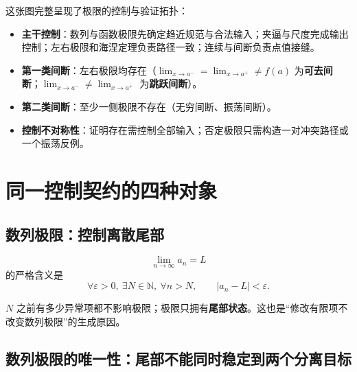 \documentclass[11pt,a4paper]{ctexart}
\newcommand{\kw}[1]{\textbf{\color{deep}#1}}
\begin{document}
\begin{center}
\end{center}

这张图完整呈现了极限的控制与验证拓扑：
\begin{itemize}
  \item \textbf{主干控制}：数列与函数极限先确定趋近规范与合法输入；夹逼与尺度完成输出控制；左右极限和海涅定理负责路径一致；连续与间断负责点值接缝。
  \item \textbf{第一类间断}：左右极限均存在（$\lim_{x\to a^-}=\lim_{x\to a^+}\ne f(a)$ 为\textbf{可去间断}；$\lim_{x\to a^-}\ne\lim_{x\to a^+}$ 为\textbf{跳跃间断}）。
  \item \textbf{第二类间断}：至少一侧极限不存在（无穷间断、振荡间断）。
  \item \textbf{控制不对称性}：证明存在需控制全部输入；否定极限只需构造一对冲突路径或一个振荡反例。
\end{itemize}

\section{同一控制契约的四种对象}

\subsection{数列极限：控制离散尾部}

\[
\lim_{n\to\infty}a_n=L
\]
的严格含义是
\[
\forall\varepsilon>0,\ \exists N\in\mathbb N,\ \forall n>N,
\qquad \lvert a_n-L\rvert<\varepsilon.
\]

$N$ 之前有多少异常项都不影响极限；极限只拥有\kw{尾部状态}。这也是“修改有限项不改变数列极限”的生成原因。

\subsection{数列极限的唯一性：尾部不能同时稳定到两个分离目标}
\end{document}
